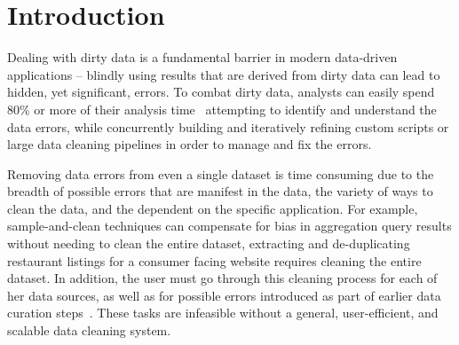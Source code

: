 \section{Introduction}\label{sec:intro}


%
%
Dealing with dirty data is a fundamental barrier in modern data-driven applications -- 
blindly using results that are derived from dirty data can lead to hidden, yet significant, errors.
To combat dirty data, analysts can easily spend 80\% or more of their analysis 
time~\cite{kandel2012} attempting to identify and understand the data errors, 
while concurrently building and iteratively refining custom scripts or large data cleaning pipelines 
in order to manage and fix the errors.  

Removing data errors from even a single dataset is 
time consuming due to the breadth of possible errors that are manifest in the data,
the variety of ways to clean the data, and the dependent on the specific application.
For example, sample-and-clean techniques can compensate for bias in aggregation query 
results without needing to clean the entire dataset, extracting and de-duplicating
restaurant listings for a consumer facing website requires cleaning the entire dataset.
In addition, the user must go through this cleaning process for each of her data sources, as well as
for possible errors introduced as part of earlier data curation steps~\cite{}.
These tasks are infeasible without a general, user-efficient, and scalable data cleaning system.





